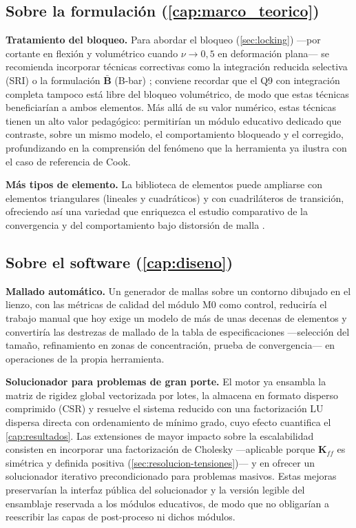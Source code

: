 \subsection*{Sobre la formulación (\autoref{cap:marco_teorico})}

\textbf{Tratamiento del bloqueo.} Para abordar el bloqueo (\autoref{sec:locking}) —por cortante en flexión y volumétrico cuando $\nu \to 0{,}5$ en deformación plana— se recomienda incorporar técnicas correctivas como la integración reducida selectiva (SRI) o la formulación $\bar{\bm{B}}$ (B-bar) \autocite{hughes2000fem,bathe2014fem}; conviene recordar que el Q9 con integración completa tampoco está libre del bloqueo volumétrico, de modo que estas técnicas beneficiarían a ambos elementos. Más allá de su valor numérico, estas técnicas tienen un alto valor pedagógico: permitirían un módulo educativo dedicado que contraste, sobre un mismo modelo, el comportamiento bloqueado y el corregido, profundizando en la comprensión del fenómeno que la herramienta ya ilustra con el caso de referencia de Cook.

\textbf{Más tipos de elemento.} La biblioteca de elementos puede ampliarse con elementos triangulares (lineales y cuadráticos) y con cuadriláteros de transición, ofreciendo así una variedad que enriquezca el estudio comparativo de la convergencia y del comportamiento bajo distorsión de malla \autocite{onate2009structural,reddy2006introduction}.

\subsection*{Sobre el software (\autoref{cap:diseno})}

\textbf{Mallado automático.} Un generador de mallas sobre un contorno dibujado en el lienzo, con las métricas de calidad del módulo M0 como control, reduciría el trabajo manual que hoy exige un modelo de más de unas decenas de elementos y convertiría las destrezas de mallado de la tabla de especificaciones —selección del tamaño, refinamiento en zonas de concentración, prueba de convergencia— en operaciones de la propia herramienta.

\textbf{Solucionador para problemas de gran porte.} El motor ya ensambla la matriz de rigidez global vectorizada por lotes, la almacena en formato disperso comprimido (CSR) y resuelve el sistema reducido con una factorización LU dispersa directa con ordenamiento de mínimo grado, cuyo efecto cuantifica el \autoref{cap:resultados}. Las extensiones de mayor impacto sobre la escalabilidad consisten en incorporar una factorización de Cholesky —aplicable porque $\bm{K}_{ff}$ es simétrica y definida positiva (\autoref{sec:resolucion-tensiones})— y en ofrecer un solucionador iterativo precondicionado para problemas masivos. Estas mejoras preservarían la interfaz pública del solucionador y la versión legible del ensamblaje reservada a los módulos educativos, de modo que no obligarían a reescribir las capas de post-proceso ni dichos módulos.

